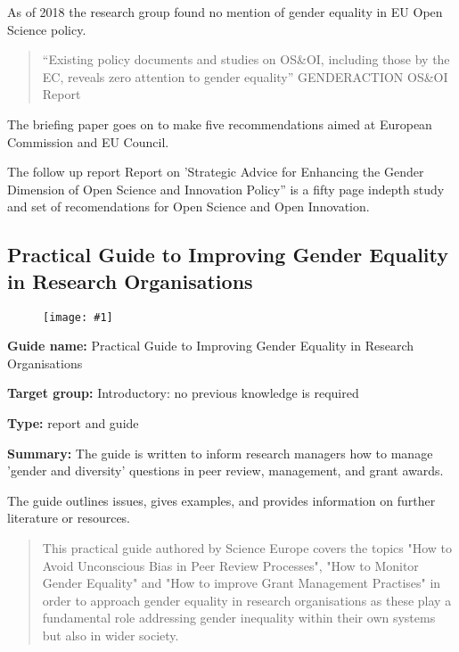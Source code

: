 \documentclass{article}
\newlength{\imgwidth}
\newcommand\scaledgraphics[2]{%
                
\settowidth{\imgwidth}{\texttt{[image: \#1]}}%
                
\setlength{\imgwidth}{\minof{\imgwidth}{#2\textwidth}}%
                
\texttt{[image: \#1]}%
                
}
\begin{document}
As of 2018 the research group found no mention of gender equality in EU Open Science policy.

\begin{quote}



“Existing policy documents and studies on OS\&OI, including those by the EC, reveals zero attention to gender equality” GENDERACTION OS\&OI Report


\end{quote}


The briefing paper goes on to make five recommendations aimed at European Commission and EU Council.


The follow up report Report on 'Strategic Advice for Enhancing the Gender Dimension of Open Science and Innovation Policy'' is a fifty page indepth study and set of recomendations for Open Science and Open Innovation.


\subsection{Practical Guide to Improving Gender Equality in Research Organisations}\label{H2478521}



\begin{center}
\begin{figure}
\scaledgraphics{2d74c16d-6a0e-48c6-a149-1074544f4a51.jpg}{0.5}
\label{F3238931}
\end{figure}


\end{center}


\textbf{Guide name:} Practical Guide to Improving Gender Equality in Research Organisations\textbf{ }\autocite{science_europe_practical_nodate}


\textbf{Target group: }Introductory: no previous knowledge is required


\textbf{Type: }report and guide


\textbf{Summary: }The guide is written to inform research managers how to manage 'gender and diversity' questions in peer review, management, and grant awards.


The guide outlines issues, gives examples, and provides information on further literature or resources.

\begin{quote}



This practical guide authored by Science Europe covers the topics "How to Avoid Unconscious Bias in Peer Review Processes", "How to Monitor Gender Equality" and "How to improve Grant Management Practises" in order to approach gender equality in research organisations as these play a fundamental role addressing gender inequality within their own systems but also in wider society.


\end{quote}





\printbibliography[title={Bibliography}]
\end{document}
